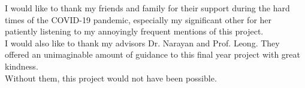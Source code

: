 \documentclass[fyp]{socreport}
\begin{document}
\begin{acknowledgement}
I would like to thank my friends and family for their support during the hard times of the COVID-19 pandemic, especially my significant other for her patiently listening to my annoyingly frequent mentions of this project.\\

\noindent I would also like to thank my advisors Dr. Narayan and Prof. Leong. They offered an unimaginable amount of guidance to this final year project with great kindness.\\

\noindent Without them, this project would not have been possible.
\end{acknowledgement}

\tableofcontents
\listoffigures 
\listoftables










\appendix





\end{document}
